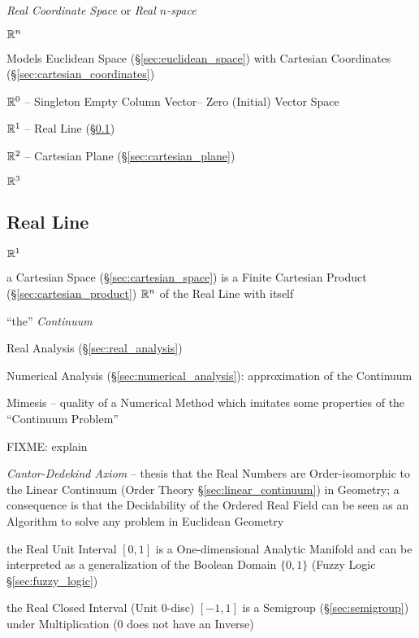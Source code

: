 \emph{Real Coordinate Space} or \emph{Real $n$-space}

$\mathbb{R}^n$

Models Euclidean Space (\S\ref{sec:euclidean_space}) with Cartesian
Coordinates (\S\ref{sec:cartesian_coordinates})

$\mathbb{R}^0$ -- Singleton Empty Column Vector-- Zero (Initial) Vector
Space

$\mathbb{R}^1$ -- Real Line (\S\ref{sec:real_line})

$\mathbb{R}^2$ -- Cartesian Plane (\S\ref{sec:cartesian_plane})

$\mathbb{R}^3$



\subsection{Real Line}\label{sec:real_line}

$\mathbb{R}^1$

a Cartesian Space (\S\ref{sec:cartesian_space}) is a Finite Cartesian Product
(\S\ref{sec:cartesian_product}) $\mathbb{R}^n$ of the Real Line with itself

``the'' \emph{Continuum}

\fist Real Analysis (\S\ref{sec:real_analysis})

\fist Numerical Analysis (\S\ref{sec:numerical_analysis}): approximation of the
Continuum

Mimesis -- quality of a Numerical Method which imitates some properties of the
``Continuum Problem''

FIXME: explain

\emph{Cantor-Dedekind Axiom} -- thesis that the Real Numbers are
Order-isomorphic to the Linear Continuum (Order Theory
\S\ref{sec:linear_continuum}) in Geometry; a consequence is that the
Decidability of the Ordered Real Field can be seen as an Algorithm to solve any
problem in Euclidean Geometry

the Real Unit Interval $[0,1]$ is a One-dimensional Analytic Manifold and can be
interpreted as a generalization of the Boolean Domain $\{0, 1\}$ (Fuzzy Logic
\S\ref{sec:fuzzy_logic})

the Real Closed Interval (Unit 0-disc) $[-1,1]$ is a Semigroup
(\S\ref{sec:semigroup}) under Multiplication ($0$ does not have an Inverse)



